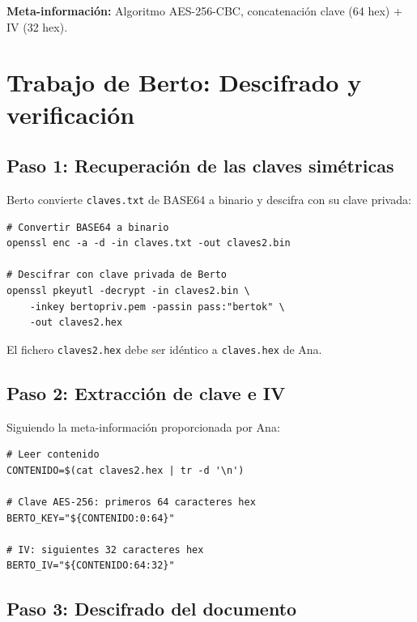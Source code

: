 \textbf{Meta-información:} Algoritmo AES-256-CBC, concatenación clave (64 hex) + IV (32 hex).


\section{Trabajo de Berto: Descifrado y verificación}

\subsection{Paso 1: Recuperación de las claves simétricas}

Berto convierte \texttt{claves.txt} de BASE64 a binario y descifra con su clave privada:

\begin{lstlisting}[caption=Recuperación de claves por Berto]
# Convertir BASE64 a binario
openssl enc -a -d -in claves.txt -out claves2.bin

# Descifrar con clave privada de Berto
openssl pkeyutl -decrypt -in claves2.bin \
    -inkey bertopriv.pem -passin pass:"bertok" \
    -out claves2.hex
\end{lstlisting}

El fichero \texttt{claves2.hex} debe ser idéntico a \texttt{claves.hex} de Ana.

\subsection{Paso 2: Extracción de clave e IV}

Siguiendo la meta-información proporcionada por Ana:

\begin{lstlisting}[caption=Extracción de clave e IV]
# Leer contenido
CONTENIDO=$(cat claves2.hex | tr -d '\n')

# Clave AES-256: primeros 64 caracteres hex
BERTO_KEY="${CONTENIDO:0:64}"

# IV: siguientes 32 caracteres hex
BERTO_IV="${CONTENIDO:64:32}"
\end{lstlisting}

\subsection{Paso 3: Descifrado del documento}

